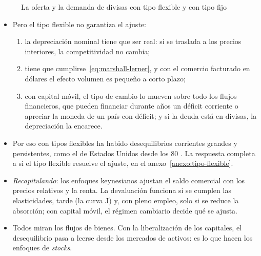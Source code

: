 \documentclass[11pt]{article}
\begin{document}
\begin{figure}[H]
\centering
\caption{La oferta y la demanda de divisas con tipo flexible y con tipo fijo}\label{fig:oferta-demanda-divisas}
\end{figure}

\begin{itemize}
\item Pero el tipo flexible no garantiza el ajuste:
  \begin{enumerate}
  \item la depreciación nominal tiene que ser real: si se traslada a los precios interiores, la competitividad no cambia;
  \item tiene que cumplirse~\eqref{eq:marshall-lerner}, y con el comercio facturado en dólares el efecto volumen es pequeño a corto plazo\nocite{Gopinath2020DCP};
  \item con capital móvil, el tipo de cambio lo mueven sobre todo los flujos financieros, que pueden financiar durante años un déficit corriente o apreciar la moneda de un país con déficit; y si la deuda está en divisas, la depreciación la encarece.
  \end{enumerate}
\item Por eso con tipos flexibles ha habido desequilibrios corrientes grandes y persistentes, como el de Estados Unidos desde los 80 . La respuesta completa a si el tipo flexible resuelve el ajuste, en el anexo~\ref{anexo:tipo-flexible}.
\end{itemize}

\begin{itemize}
\item \emph{Recapitulando}: los enfoques keynesianos ajustan el saldo comercial con los precios relativos y la renta. La devaluación funciona si se cumplen las elasticidades, tarde (la curva J) y, con pleno empleo, solo si se reduce la absorción; con capital móvil, el régimen cambiario decide qué se ajusta.
\item Todos miran los flujos de bienes. Con la liberalización de los capitales, el desequilibrio pasa a leerse desde los mercados de activos: es lo que hacen los enfoques de \emph{stocks}.
\end{itemize}
\end{document}
